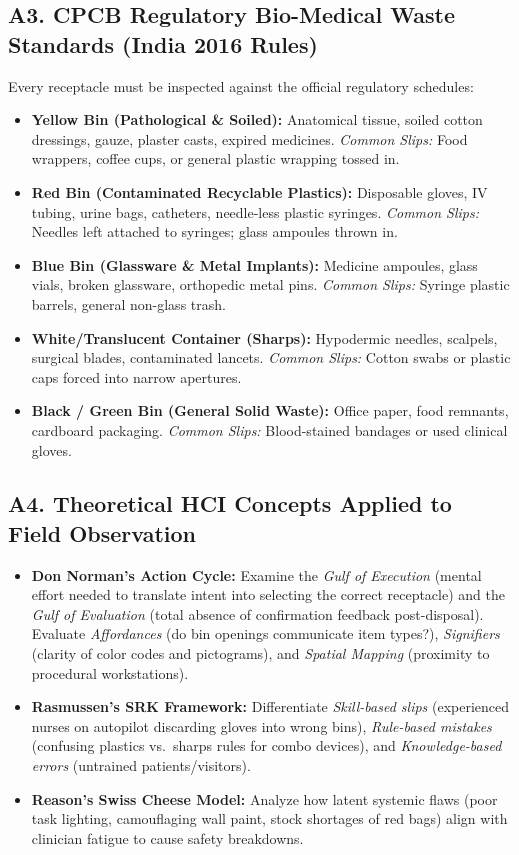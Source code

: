 \documentclass[11pt,a4paper]{article}
\begin{document}
\subsection{A3. CPCB Regulatory Bio-Medical Waste Standards (India 2016 Rules)}
Every receptacle must be inspected against the official regulatory schedules:
\begin{itemize}[leftmargin=*, nosep]
    \item \textbf{\color{bmwyellow}Yellow Bin (Pathological \& Soiled):} Anatomical tissue, soiled cotton dressings, gauze, plaster casts, expired medicines. \emph{Common Slips:} Food wrappers, coffee cups, or general plastic wrapping tossed in.
    \item \textbf{\color{bmwred}Red Bin (Contaminated Recyclable Plastics):} Disposable gloves, IV tubing, urine bags, catheters, needle-less plastic syringes. \emph{Common Slips:} Needles left attached to syringes; glass ampoules thrown in.
    \item \textbf{\color{bmwblue}Blue Bin (Glassware \& Metal Implants):} Medicine ampoules, glass vials, broken glassware, orthopedic metal pins. \emph{Common Slips:} Syringe plastic barrels, general non-glass trash.
    \item \textbf{\color{bmwwhite}White/Translucent Container (Sharps):} Hypodermic needles, scalpels, surgical blades, contaminated lancets. \emph{Common Slips:} Cotton swabs or plastic caps forced into narrow apertures.
    \item \textbf{\color{bmwblack}Black / Green Bin (General Solid Waste):} Office paper, food remnants, cardboard packaging. \emph{Common Slips:} Blood-stained bandages or used clinical gloves.
\end{itemize}

\subsection{A4. Theoretical HCI Concepts Applied to Field Observation}
\begin{itemize}[leftmargin=*, nosep]
    \item \textbf{Don Norman's Action Cycle:} Examine the \emph{Gulf of Execution} (mental effort needed to translate intent into selecting the correct receptacle) and the \emph{Gulf of Evaluation} (total absence of confirmation feedback post-disposal). Evaluate \emph{Affordances} (do bin openings communicate item types?), \emph{Signifiers} (clarity of color codes and pictograms), and \emph{Spatial Mapping} (proximity to procedural workstations).
    \item \textbf{Rasmussen's SRK Framework:} Differentiate \emph{Skill-based slips} (experienced nurses on autopilot discarding gloves into wrong bins), \emph{Rule-based mistakes} (confusing plastics vs.\ sharps rules for combo devices), and \emph{Knowledge-based errors} (untrained patients/visitors).
    \item \textbf{Reason's Swiss Cheese Model:} Analyze how latent systemic flaws (poor task lighting, camouflaging wall paint, stock shortages of red bags) align with clinician fatigue to cause safety breakdowns.
\end{itemize}
\end{document}
